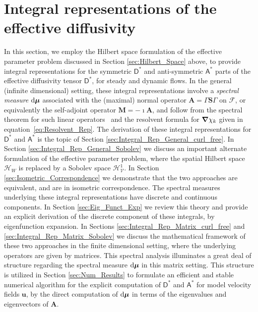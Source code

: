 \documentclass[leqno,onefignum,onetabnum]{siamltex1213}
\renewcommand{\d}{\mathrm{d}}
\newcommand{\Mb}{\mathbf{M}}
\newcommand{\Sb}{\mathbf{S}}
\newcommand{\Ab}{\mathbf{A}}
\newcommand{\Vc}{\mathcal{V}}
\newcommand{\Hc}{\mathcal{H}}
\newcommand{\Fc}{\mathcal{F}}
\newcommand{\Dm}{\mathsf{D}}
\newcommand{\Am}{\mathsf{A}}
\newcommand{\Hs}{\mathscr{H}}
\newcommand\bmu{\mbox{\boldmath${\mu}$}}
\newcommand\bnabla{\mbox{\boldmath${\nabla}$}}
\newcommand{\vecu}{\boldsymbol{u}}
\begin{document}
\section{Integral representations of the effective
  diffusivity} \label{sec:Integral_Rep} 
%
In this section, we employ the Hilbert space formulation of the
effective parameter problem discussed in Section
\ref{sec:Hilbert_Space} above, to provide integral representations for the
symmetric $\Dm^*$ and anti-symmetric $\Am^*$ parts of the
effective diffusivity tensor $\Dm^*$, for steady and dynamic
flows. In the general (infinite dimensional) setting, these integral
representations involve a \emph{spectral measure} $\d\bmu$ associated
with the (maximal) normal operator $\Ab=\Gamma\Sb\Gamma$ on $\Fc$,
or equivalently the self-adjoint operator $\Mb=-\imath\Ab$, and follow from
the spectral theorem for such linear
operators~\cite{Reed-1980,Stone:64} and the resolvent formula for
$\bnabla \chi_k$ 
given in equation~\eqref{eq:Resolvent_Rep}. The derivation of these
integral representations for $\Dm^*$ and $\Am^*$ is the topic
of Section \ref{sec:Integral_Rep_General_curl_free}. In Section
\ref{sec:Integral_Rep_General_Sobolev} we discuss an important
alternate formulation of the effective parameter problem, where the
spatial Hilbert space $\Hc_W$ is replaced by a Sobolev space
$\Hs^1_{\Vc}$. In Section \ref{sec:Isometric_Correspondence} we
demonstrate that the two approaches are equivalent, and are in
isometric correspondence. The spectral measures underlying these
integral representations have discrete and continuous components. In
Section \ref{sec:Eig_Funct_Exp} we review this theory and provide an
explicit derivation of the discrete component of these integrals, by
eigenfunction expansion. In Sections
\ref{sec:Integral_Rep_Matrix_curl_free} and
\ref{sec:Integral_Rep_Matrix_Sobolev} we discuss the mathematical
framework of these two approaches in the finite dimensional setting, 
where the underlying operators are given by matrices. This spectral
analysis illuminates a great deal of structure regarding the spectral
measure $\d\bmu$ in this matrix setting. This structure is utilized in
Section \ref{sec:Num_Results} to formulate an efficient and stable
numerical algorithm for the explicit computation of $\Dm^*$ and
$\Am^*$ for model velocity fields $\vecu $, by the direct
computation of $\d\bmu$ in terms of the eigenvalues and eigenvectors
of $\Ab$.    
\end{document}
